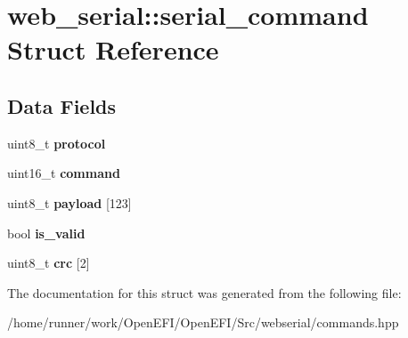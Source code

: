 \hypertarget{structweb__serial_1_1serial__command}{}\section{web\+\_\+serial\+:\+:serial\+\_\+command Struct Reference}
\label{structweb__serial_1_1serial__command}
\subsection*{Data Fields}
\begin{DoxyCompactItemize}
\item 
\mbox{\label{structweb__serial_1_1serial__command_ac4416bc0d0cc1d325beeb0729ab019f6}} 
uint8\+\_\+t {\bfseries protocol}
\item 
\mbox{\label{structweb__serial_1_1serial__command_a752acd0ca70a89a66bc86aab140657fe}} 
uint16\+\_\+t {\bfseries command}
\item 
\mbox{\label{structweb__serial_1_1serial__command_ad19f09253d9c44ebeec74da88137496d}} 
uint8\+\_\+t {\bfseries payload} \mbox{[}123\mbox{]}
\item 
\mbox{\label{structweb__serial_1_1serial__command_ae120fa7eab0b26fdeb0ffc8d9d7c85d3}} 
bool {\bfseries is\+\_\+valid}
\item 
\mbox{\label{structweb__serial_1_1serial__command_a4230269eee1bba2b5637a25efb253aa1}} 
uint8\+\_\+t {\bfseries crc} \mbox{[}2\mbox{]}
\end{DoxyCompactItemize}


The documentation for this struct was generated from the following file\+:\begin{DoxyCompactItemize}
\item 
/home/runner/work/\+Open\+E\+F\+I/\+Open\+E\+F\+I/\+Src/webserial/commands.\+hpp\end{DoxyCompactItemize}
